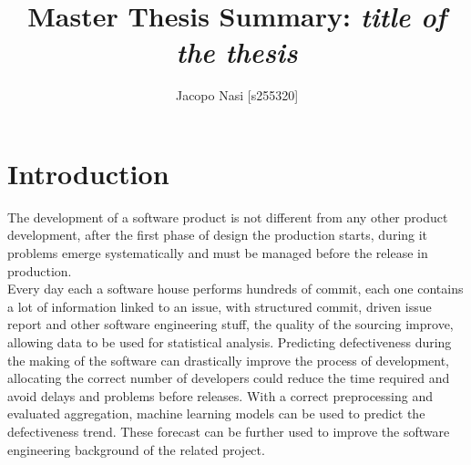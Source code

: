 \documentclass{article}
\begin{document}
\title{Master Thesis Summary: \textit{title of the thesis}}

\author{Jacopo Nasi [s255320]}

\maketitle

\section{Introduction}
The development of a software product is not different from any other product development, after the first phase of design the production starts, during it problems emerge systematically and must be managed before the release in production.\\
Every day each a software house performs hundreds of commit, each one contains a lot of information linked to an issue, with structured commit, driven issue report and other software engineering stuff, the quality of the sourcing improve, allowing data to be used for statistical analysis. Predicting defectiveness during the making of the software can drastically improve the process of development, allocating the correct number of developers could reduce the time required and avoid delays and problems before releases.
With a correct preprocessing and evaluated aggregation, machine learning models can be used to predict the defectiveness trend. These forecast can be further used to improve the software engineering background of the related project.
\end{document}
